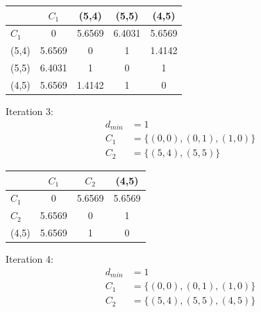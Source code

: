 \documentclass[fleqn]{article}
\begin{document}
\begin{description}
    \begin{tabular}{ l c c c c }
        & \begin{math}C_1\end{math}        & (5,4)  & (5,5)  & (4,5)  \\
        \hline
        \begin{math}C_1\end{math} & 0      & 5.6569 & 6.4031 & 5.6569 \\
        (5,4)                     & 5.6569 & 0      & 1      & 1.4142 \\
        (5,5)                     & 6.4031 & 1      & 0      & 1      \\
        (4,5)                     & 5.6569 & 1.4142 & 1      & 0      \\
    \end{tabular}
    \newline

    Iteration 3:
    \begin{align*}
        d_{min} &= 1 \\
        C_1 &= \{ (0,0), (0,1), (1,0) \} \\
        C_2 &= \{ (5,4), (5,5) \}
    \end{align*}

    \begin{tabular}{ l c c c }
        & \begin{math}C_1\end{math} & \begin{math}C_2\end{math} & (4,5)  \\
        \hline
        \begin{math}C_1\end{math} & 0      & 5.6569 & 5.6569 \\
        \begin{math}C_2\end{math} & 5.6569 & 0      & 1 \\
        (4,5)                     & 5.6569 & 1      & 0      \\
    \end{tabular}
    \newline

    Iteration 4:
    \begin{align*}
        d_{min} &= 1 \\
        C_1 &= \{ (0,0), (0,1), (1,0) \} \\
        C_2 &= \{ (5,4), (5,5), (4,5) \}
    \end{align*}


\end{description}
\end{document}
